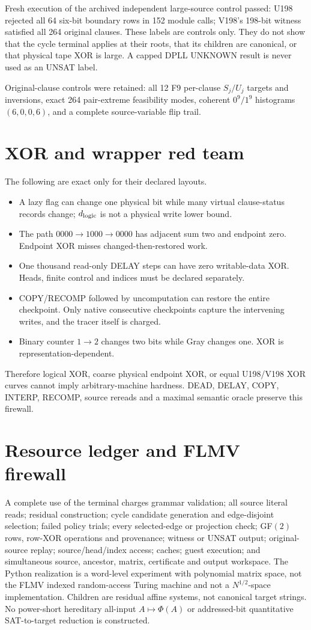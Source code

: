 \documentclass[11pt]{article}
\begin{document}
Fresh execution of the archived independent large-source control passed:
U198 rejected all 64 six-bit boundary rows in 152 module calls; V198's
198-bit witness satisfied all 264 original clauses.  These labels are controls
only.  They do not show that the cycle terminal applies at their roots, that
its children are canonical, or that physical tape XOR is large.  A capped
DPLL UNKNOWN result is never used as an UNSAT label.

Original-clause controls were retained: all 12 F9 per-clause $S_j/U_j$
targets and inversions, exact 264 pair-extreme feasibility modes, coherent
$0^9/1^9$ histograms $(6,0,0,6)$, and a complete source-variable flip trail.

\section{XOR and wrapper red team}
The following are exact only for their declared layouts.
\begin{itemize}
\item A lazy flag can change one physical bit while many virtual clause-status
records change; $d_{\rm logic}$ is not a physical write lower bound.
\item The path $0000\to1000\to0000$ has adjacent sum two and endpoint zero.
Endpoint XOR misses changed-then-restored work.
\item One thousand read-only DELAY steps can have zero writable-data XOR.
Heads, finite control and indices must be declared separately.
\item COPY/RECOMP followed by uncomputation can restore the entire checkpoint.
Only native consecutive checkpoints capture the intervening writes, and the
tracer itself is charged.
\item Binary counter $1\to2$ changes two bits while Gray changes one.  XOR is
representation-dependent.
\end{itemize}
Therefore logical XOR, coarse physical endpoint XOR, or equal U198/V198 XOR
curves cannot imply arbitrary-machine hardness.  DEAD, DELAY, COPY, INTERP,
RECOMP, source rereads and a maximal semantic oracle preserve this firewall.

\section{Resource ledger and FLMV firewall}
A complete use of the terminal charges grammar validation; all source literal
reads; residual construction; cycle candidate generation and edge-disjoint
selection; failed policy trials; every selected-edge or projection check;
GF$(2)$ rows, row-XOR operations and provenance; witness or UNSAT output;
original-source replay; source/head/index access; caches; guest execution;
and simultaneous source, ancestor, matrix, certificate and output workspace.
The Python realization is a word-level experiment with polynomial matrix
space, not the FLMV indexed random-access Turing machine and not a
$N^{1/2}$-space implementation.  Children are residual affine systems, not
canonical target strings.  No power-short hereditary all-input
$A\mapsto\Phi(A)$ or addressed-bit quantitative SAT-to-target reduction is
constructed.
\end{document}
